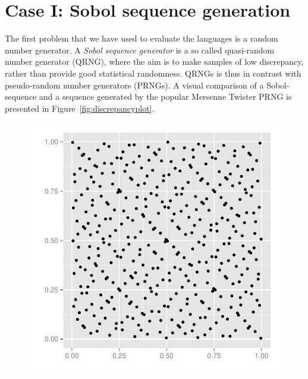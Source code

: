 \documentclass[preprint]{sigplanconf}
\begin{document}
\section{Case I: Sobol sequence generation}
The first problem that we have used to evaluate the languages is a
random number generator. A \emph{Sobol sequence generator} is a so
called quasi-random number generator (QRNG), where the aim is to make
samples of low discrepancy, rather than provide good statistical
randomness. QRNGs is thus in contrast with pseudo-random number
generators (PRNGs). A visual comparison of a Sobol-sequence and a
sequence generated by the popular Mersenne Twister PRNG is presented
in Figure~\ref{fig:discrepancyplot}.
\begin{figure}
  \centering
  \begin{minipage}{0.45\linewidth}
    \begin{center}
      \includegraphics[width=\textwidth]{../report/graphics/2D-sobol-sequence.pdf}


\end{center}
\end{minipage}
\end{figure}
\end{document}
